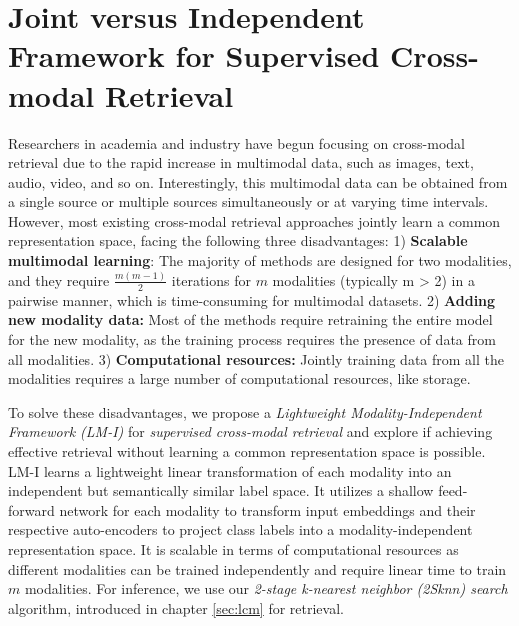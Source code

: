 \section{Joint versus Independent Framework for Supervised Cross-modal Retrieval}
\label{sec:LMI}

Researchers in academia and industry have begun focusing on cross-modal retrieval due to the rapid increase in multimodal data, such as images, text, audio, video, and so on. Interestingly, this multimodal data can be obtained from a single source or multiple sources simultaneously or at varying time intervals. However, most existing cross-modal retrieval approaches \cite{dwijesh, clip4cmr, dscmr} jointly learn a common representation space, facing the following three disadvantages:
1) \textbf{Scalable multimodal learning}: The majority of methods are designed for two modalities, and they require \(\frac{m(m - 1)}{2}\) iterations for \(m\) modalities (typically m > 2) in a pairwise manner, which is time-consuming for multimodal datasets. 
2) \textbf{Adding new modality data:} Most of the methods require retraining the entire model for the new modality, as the training process requires the presence of data from all modalities.
3) \textbf{Computational resources:} Jointly training data from all the modalities requires a large number of computational resources, like storage. 

\par To solve these disadvantages, we propose a \textit{Lightweight Modality-Independent Framework (LM-I)} for \textit{supervised cross-modal retrieval} and explore if achieving effective retrieval without learning a common representation space is possible.
LM-I learns a lightweight linear transformation of each modality into an independent but semantically similar label space. It utilizes a shallow feed-forward network for each modality to transform input embeddings and their respective auto-encoders to project class labels into a modality-independent representation space. It is scalable in terms of computational resources as different modalities can be trained independently and require linear time to train \(m\) modalities.
For inference, we use our \textit{2-stage k-nearest neighbor (2Sknn) search} algorithm, introduced in chapter \ref{sec:lcm} for retrieval.

